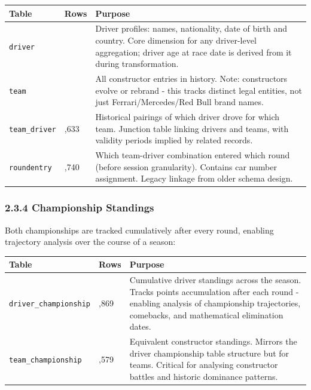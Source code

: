 \documentclass[
]{article}
\begin{document}
\begin{table}[!h]
\centering\begingroup\fontsize{9}{11}\selectfont

\begin{tabular}[t]{>{\raggedright\arraybackslash}p{4.5cm}>{\raggedright\arraybackslash}p{1.5cm}>{\raggedright\arraybackslash}p{9cm}}
\toprule
Table & Rows & Purpose\\
\midrule
\texttt{driver} & 884 & Driver profiles: names, nationality, date of birth and country. Core dimension for any driver-level aggregation; driver age at race date is derived from it during transformation.\\
\texttt{team} & 214 & All constructor entries in history. Note: constructors evolve or rebrand - this tracks distinct legal entities, not just Ferrari/Mercedes/Red Bull brand names.\\
\texttt{team\_driver} & 3,633 & Historical pairings of which driver drove for which team. Junction table linking drivers and teams, with validity periods implied by related records.\\
\texttt{roundentry} & 27,740 & Which team-driver combination entered which round (before session granularity). Contains car number assignment. Legacy linkage from older schema design.\\
\bottomrule
\end{tabular}
\endgroup{}
\end{table}

\subsubsection{2.3.4 Championship
Standings}\label{championship-standings}

Both championships are tracked cumulatively after every round, enabling
trajectory analysis over the course of a season:

\begin{table}[!h]
\centering\begingroup\fontsize{9}{11}\selectfont

\begin{tabular}[t]{>{\raggedright\arraybackslash}p{4.5cm}>{\raggedright\arraybackslash}p{1.5cm}>{\raggedright\arraybackslash}p{9cm}}
\toprule
Table & Rows & Purpose\\
\midrule
\texttt{driver\_championship} & 36,869 & Cumulative driver standings across the season. Tracks points accumulation after each round - enabling analysis of championship trajectories, comebacks, and mathematical elimination dates.\\
\texttt{team\_championship} & 14,579 & Equivalent constructor standings. Mirrors the driver championship table structure but for teams. Critical for analysing constructor battles and historic dominance patterns.\\
\bottomrule
\end{tabular}
\endgroup{}
\end{table}
\end{document}
